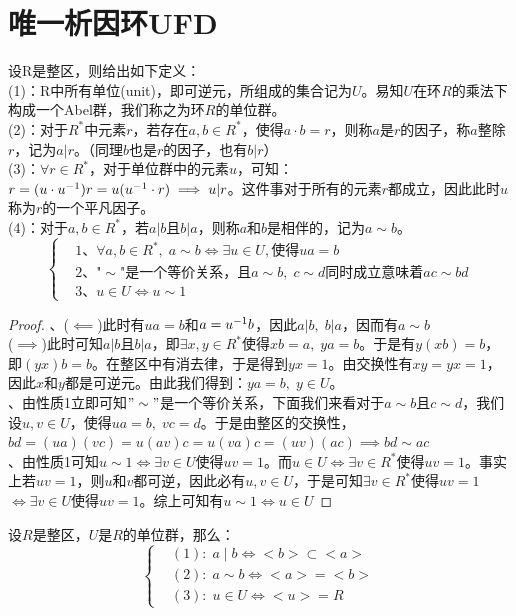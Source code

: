 \section{唯一析因环UFD}

设R是整区，则给出如下定义：\\
\indent (1)：R中所有单位(unit)，即可逆元，所组成的集合记为$U$。易知$U$在环$R$的乘法下构成一个Abel群，我们称之为环$R$的单位群。\\
\indent (2)：对于$R^*$中元素$r$，若存在$a,b\in R^*$，使得$a\cdot b=r$，则称$a$是$r$的因子，称$a$整除$r$，记为$a|r$。（同理$b$也是$r$的因子，也有$b|r$）\\
\indent (3)：$\forall r\in R^*$，对于单位群中的元素$u$，可知：$r=(u\cdot {u}^{-1})r=u({u}^{-1}\cdot r)\implies u|r$。这件事对于所有的元素$r$都成立，因此此时$u$称为$r$的一个平凡因子。\\
\indent (4)：对于$a,b\in R^*$，若$a|b$且$b|a$，则称$a$和$b$是相伴的，记为$a\sim b$。\\
\[
\left\{
\begin{aligned}
&\text{1、}\forall a,b\in R^*,\; a\sim b\iff \exists u\in U,\text{使得}ua=b\\
&\text{2、"}\sim\text{"是一个等价关系，且}a\sim b,\; c\sim d\text{同时成立意味着}ac\sim bd\\
&\text{3、}u\in U\iff u\sim 1
\end{aligned}\right.
\]
\begin{proof}
、($\impliedby$)此时有$ua=b$和$a={u}^{-1}b$，因此$a|b,\; b|a$，因而有$a\sim b$\\
($\implies$)此时可知$a|b$且$b|a$，即$\exists x,y\in R^*$使得$xb=a,\; ya=b$。于是有$y(xb)=b$，即$(yx)b=b$。在整区中有消去律，于是得到$yx=1$。由交换性有$xy=yx=1$，因此$x$和$y$都是可逆元。由此我们得到：$ya=b,\; y\in U$。\\
、由性质1立即可知$"\sim"$是一个等价关系，下面我们来看对于$a\sim b$且$c\sim d$，我们设$u,v\in U$，使得$ua=b,\; vc=d$。于是由整区的交换性，$bd=(ua)(vc)=u(av)c=u(va)c=(uv)(ac)\implies bd\sim ac$\\
、由性质1可知$u\sim 1\iff \exists v\in U$使得$uv=1$。而$u\in U\iff \exists v\in R^*$使得$uv=1$。事实上若$uv=1$，则$u$和$v$都可逆，因此必有$u,v\in U$，于是可知$\exists v\in R^*$使得$uv=1$$\iff \exists v\in U$使得$uv=1$。综上可知有$u\sim 1\iff u\in U$
\end{proof}
设$R$是整区，$U$是$R$的单位群，那么：
\[
\left\{
\begin{aligned}
&(1):\;a\mid b\iff <b>\subset <a>\\
&(2):\;a\sim b\iff <a>=<b>\\
&(3):\;u\in U\iff <u>=R
\end{aligned}\right.
\]
